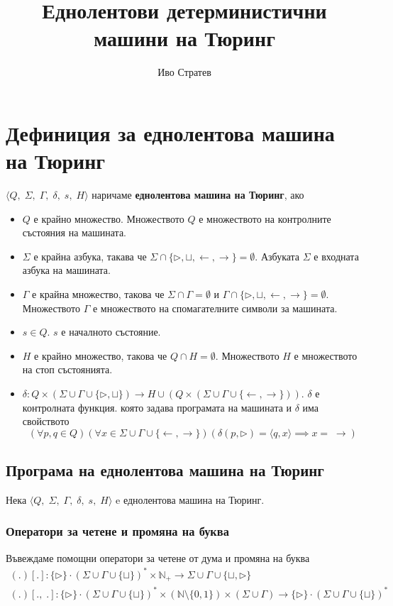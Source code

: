 \documentclass[14pt]{extarticle}
\title{Еднолентови детерминистични машини на Тюринг}
\author{Иво Стратев}
\begin{document}
\maketitle

\section*{Дефиниция за еднолентова машина на Тюринг}
\(\langle Q,\; \Sigma,\; \Gamma,\; \delta,\; s,\; H \rangle\) наричаме \textbf{еднолентова машина на Тюринг}, ако

\begin{itemize}
    \item \(Q\) е крайно множество. Множеството \(Q\) е множеството на контролните състояния на машината.
    \item \(\Sigma\) е крайна азбука, такава че \(\Sigma \cap \{\triangleright, \sqcup, \leftarrow, \rightarrow\} = \emptyset\). Азбуката \(\Sigma\) е входната азбука на машината.
    \item \(\Gamma\) е крайна множество, такова че \(\Sigma \cap \Gamma = \emptyset\) и \(\Gamma \cap \{\triangleright, \sqcup, \leftarrow, \rightarrow\} = \emptyset\). Множеството \(\Gamma\) е множеството на спомагателните символи за машината.
    \item \(s \in Q\). \(s\) е началното състояние.
    \item \(H\) е крайно множество, такова че \(Q \cap H = \emptyset\). Множеството \(H\) е множеството на стоп състоянията.
    \item \(\delta : Q \times (\Sigma \cup \Gamma \cup \{ \triangleright, \sqcup \}) \to H \cup (Q \times (\Sigma \cup \Gamma \cup \{\leftarrow, \rightarrow\}))\). \(\delta\) е контролната функция. която задава програмата на машината и \(\delta\) има свойството
    \[(\forall p, q \in Q)(\forall x \in \Sigma \cup \Gamma \cup \{\leftarrow, \rightarrow\})(\delta(p, \triangleright) = \langle q, x \rangle \implies x = \;\rightarrow )\]
\end{itemize}


\subsection*{Програма на еднолентова машина на Тюринг}
Нека \(\langle Q,\; \Sigma,\; \Gamma,\; \delta,\; s,\; H \rangle\) e еднолентова машина на Тюринг.


\subsubsection*{Оператори за четене и промяна на буква}
Въвеждаме помощни оператори за четене от дума и промяна на буква
\begin{align*}
    (.)[.] : \{\triangleright\} \cdot (\Sigma \cup \Gamma \cup \{\sqcup\})^* \times \mathbb{N}_+ \to \Sigma \cup \Gamma \cup \{\sqcup, \triangleright\}  \\
    (.)[.,\; .] : \{\triangleright\} \cdot (\Sigma \cup \Gamma \cup \{\sqcup\})^* \times (\mathbb{N} \setminus \{0, 1\} ) \times (\Sigma \cup \Gamma) \to \{\triangleright\} \cdot (\Sigma \cup \Gamma \cup \{\sqcup\})^* 
\end{align*}
\end{document}
